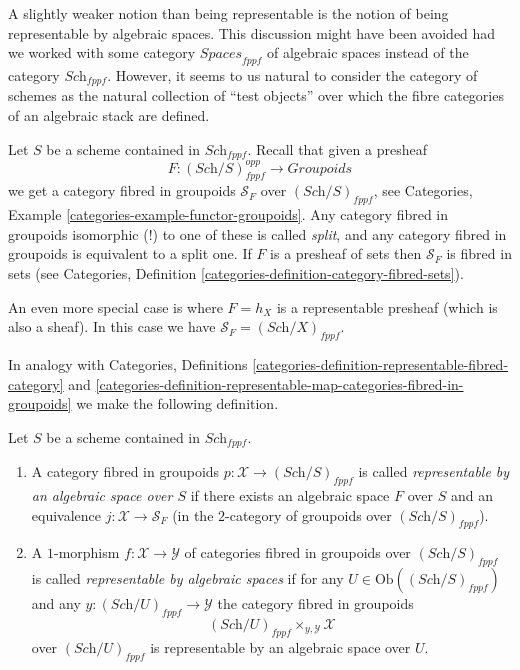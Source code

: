 \noindent
A slightly weaker notion than being representable is the notion of
being representable by algebraic spaces. This discussion might have
been avoided had we worked with some category $\textit{Spaces}_{fppf}$
of algebraic spaces instead of the category $\textit{Sch}_{fppf}$.
However, it seems to us natural to consider the category of schemes
as the natural collection of ``test objects'' over which the fibre
categories of an algebraic stack are defined.

\medskip\noindent
Let $S$ be a scheme contained in $\textit{Sch}_{fppf}$.
Recall that given a presheaf
$$
F : (\textit{Sch}/S)_{fppf}^{opp} \longrightarrow \textit{Groupoids}
$$
we get a category fibred in groupoids $\mathcal{S}_F$ over
$(\textit{Sch}/S)_{fppf}$, see
Categories, Example \ref{categories-example-functor-groupoids}.
Any category fibred in groupoids isomorphic (!) to one of these
is called {\it split}, and any category fibred in groupoids
is equivalent to a split one.
If $F$ is a presheaf of sets then $\mathcal{S}_F$ is
fibred in sets (see Categories,
Definition \ref{categories-definition-category-fibred-sets}).

\medskip\noindent
An even more special case is where $F = h_X$ is a representable
presheaf (which is also a sheaf). In this case we have
$\mathcal{S}_F = (\textit{Sch}/X)_{fppf}$.

\medskip\noindent
In analogy with Categories, Definitions
\ref{categories-definition-representable-fibred-category} and
\ref{categories-definition-representable-map-categories-fibred-in-groupoids}
we make the following definition.

\begin{definition}
\label{definition-representable-by-algebraic-spaces}
Let $S$ be a scheme contained in $\textit{Sch}_{fppf}$.
\begin{enumerate}
\item A category fibred in groupoids
$p : \mathcal{X} \to (\textit{Sch}/S)_{fppf}$ is
called {\it representable by an algebraic space over $S$}
if there exists an algebraic space $F$ over $S$ and an equivalence
$j : \mathcal{X} \to \mathcal{S}_F$
(in the $2$-category of groupoids over $(\textit{Sch}/S)_{fppf}$).
\item A $1$-morphism $f : \mathcal{X} \to \mathcal{Y}$ of
categories fibred in groupoids over $(\textit{Sch}/S)_{fppf}$
is called {\it representable by algebraic spaces} if
for any $U \in \text{Ob}((\textit{Sch}/S)_{fppf})$
and any $y : (\textit{Sch}/U)_{fppf} \to \mathcal{Y}$
the category fibred in groupoids
$$
(\textit{Sch}/U)_{fppf} \times_{y, \mathcal{Y}} \mathcal{X}
$$
over $(\textit{Sch}/U)_{fppf}$
is representable by an algebraic space over $U$.
\end{enumerate}
\end{definition}

